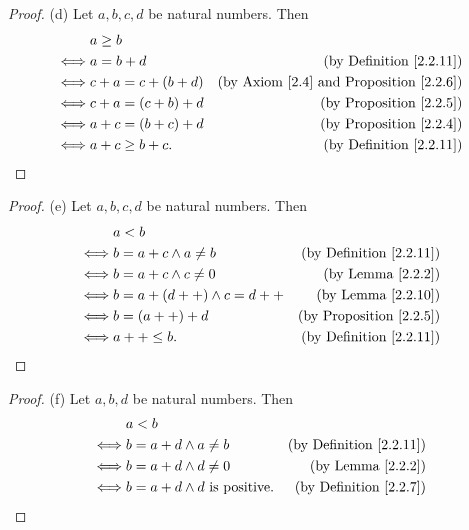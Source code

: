 \begin{proof}{(d)}
    Let \(a, b, c, d\) be natural numbers.
    Then
    \begin{align*}
             & a \geq b                                                                      \\
        \iff & a = b + d           & \text{(by Definition \ref{2.2.11})}                     \\
        \iff & c + a = c + (b + d) & \text{(by Axiom \ref{2.4} and Proposition \ref{2.2.6})} \\
        \iff & c + a = (c + b) + d & \text{(by Proposition \ref{2.2.5})}                     \\
        \iff & a + c = (b + c) + d & \text{(by Proposition \ref{2.2.4})}                     \\
        \iff & a + c \geq b + c.   & \text{(by Definition \ref{2.2.11})}
    \end{align*}
\end{proof}

\begin{proof}{(e)}
    Let \(a, b, c, d\) be natural numbers.
    Then
    \begin{align*}
             & a < b                                                             \\
        \iff & b = a + c \land a \neq b    & \text{(by Definition \ref{2.2.11})} \\
        \iff & b = a + c \land c \neq 0    & \text{(by Lemma \ref{2.2.2})}       \\
        \iff & b = a + (d++) \land c = d++ & \text{(by Lemma \ref{2.2.10})}      \\
        \iff & b = (a++) + d               & \text{(by Proposition \ref{2.2.5})} \\
        \iff & a++ \leq b.                 & \text{(by Definition \ref{2.2.11})}
    \end{align*}
\end{proof}

\begin{proof}{(f)}
    Let \(a, b, d\) be natural numbers.
    Then
    \begin{align*}
             & a < b                                                                        \\
        \iff & b = a + d \land a \neq b               & \text{(by Definition \ref{2.2.11})} \\
        \iff & b = a + d \land d \neq 0               & \text{(by Lemma \ref{2.2.2})}       \\
        \iff & b = a + d \land d \text{ is positive}. & \text{(by Definition \ref{2.2.7})}
    \end{align*}
\end{proof}

